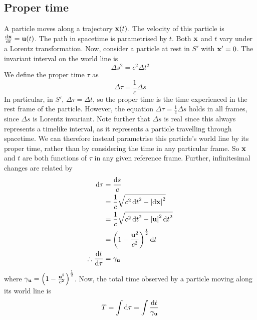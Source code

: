 \subsection{Proper time}
A particle moves along a trajectory \(\vb x(t)\).
The velocity of this particle is \(\dv{\vb x}{t} = \vb u(t)\).
The path in spacetime is parametrised by \(t\).
Both \(\vb x\) and \(t\) vary under a Lorentz transformation.
Now, consider a particle at rest in \(S'\) with \(\vb x' = 0\).
The invariant interval on the world line is
\[
	\Delta s^2 = c^2 \Delta t^2
\]
We define the proper time \(\tau\) as
\[
	\Delta \tau = \frac{1}{c}\Delta s
\]
In particular, in \(S'\), \(\Delta\tau = \Delta t\), so the proper time is the time experienced in the rest frame of the particle.
However, the equation \(\Delta \tau = \frac{1}{c}\Delta s\) holds in all frames, since \(\Delta s\) is Lorentz invariant.
Note further that \(\Delta s\) is real since this always represents a timelike interval, as it represents a particle travelling through spacetime.
We can therefore instead parametrise this particle's world line by its proper time, rather than by considering the time in any particular frame.
So \(\vb x\) and \(t\) are both functions of \(\tau\) in any given reference frame.
Further, infinitesimal changes are related by
\begin{align*}
	\dd{\tau}               & = \frac{\dd{s}}{c}                                       \\
	                        & = \frac{1}{c}\sqrt{c^2\dd{t}^2 - \abs{\dd{\vb x}}^2}     \\
	                        & = \frac{1}{c}\sqrt{c^2\dd{t}^2 - \abs{\vb u}^2 \dd{t}^2} \\
	                        & = \qty(1 - \frac{\vb u^2}{c^2})^{\frac{1}{2}}\dd{t}      \\
	\therefore \dv{t}{\tau} & = \gamma_{\vb u}
\end{align*}
where \(\gamma_{\vb u} = \qty(1 - \frac{\vb u^2}{c^2})^{\frac{1}{2}}\).
Now, the total time observed by a particle moving along its world line is
\[
	T = \int \dd{\tau} = \int \frac{\dd{t}}{\gamma_{\vb u}}
\]

